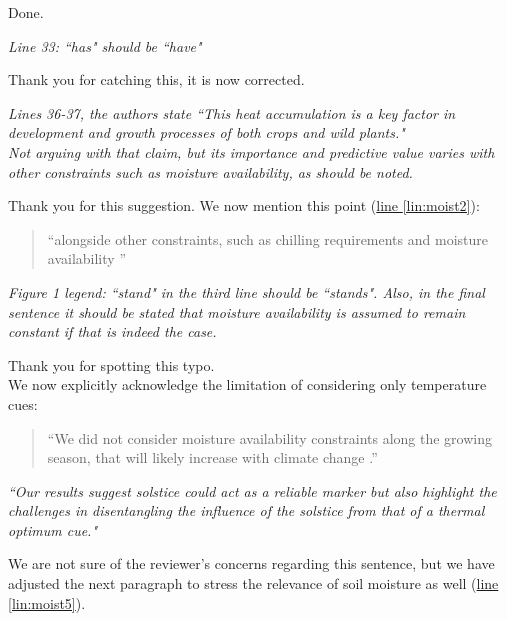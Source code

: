 \documentclass[11pt,letter]{article}
\begin{document}
Done.\\

\begin{mybox}
\emph{Line 33: ``has" should be ``have"}
\end{mybox}

Thank you for catching this, it is now corrected.\\

\begin{mybox}
\emph{Lines 36-37, the authors state ``This heat accumulation is a key factor in development and growth processes of both crops and wild plants."\\
Not arguing with that claim, but its importance and predictive value varies with other constraints such as moisture availability, as should be noted.}
\end{mybox}

Thank you for this suggestion. We now mention this point (\href{file:synchrony_r1\#lintarget:moist2}{line \ref*{lin:moist2}}):
\begin{quote}
    ``alongside other constraints, such as chilling requirements \citep{Chuine2017} and moisture availability \citep{Garonna2018}''
\end{quote}

\begin{mybox}
\emph{Figure 1 legend: ``stand" in the third line should be ``stands". Also, in the final sentence it should be stated that moisture availability is assumed to remain constant if that is indeed the case.}
\end{mybox}

Thank you for spotting this typo.\\
We now explicitly acknowledge the limitation of considering only temperature cues:
\begin{quote}
    ``We did not consider moisture availability constraints along the growing season, that will likely increase with climate change \citep{Garonna2018, Zhao2010, Seo2025}.''
\end{quote}

\begin{mybox}
\emph{``Our results suggest solstice could act as a reliable marker but also highlight the challenges in disentangling the influence of the solstice from that of a thermal optimum cue."}
\end{mybox}

We are not sure of the reviewer's concerns regarding this sentence, but we have adjusted the next paragraph to stress the relevance of soil moisture as well (\href{file:synchrony_r1\#lintarget:moist5}{line \ref*{lin:moist5}}). \\
\end{document}
